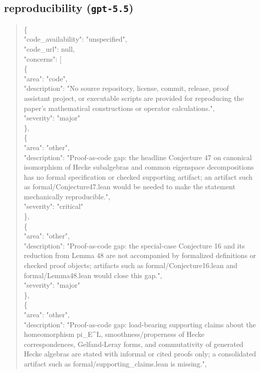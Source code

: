 \documentclass[11pt]{article}
\begin{document}
\subsection*{reproducibility (\texttt{gpt-5.5})}
\begin{quote}\small\ttfamily\raggedright
\{\\
  "code\_availability": "unspecified",\\
  "code\_url": null,\\
  "concerns": [\\
    \{\\
      "area": "code",\\
      "description": "No source repository, license, commit, release, proof assistant project, or executable scripts are provided for reproducing the paper's mathematical constructions or operator calculations.",\\
      "severity": "major"\\
    \},\\
    \{\\
      "area": "other",\\
      "description": "Proof-as-code gap: the headline Conjecture 47 on canonical isomorphism of Hecke subalgebras and common eigenspace decompositions has no formal specification or checked supporting artifact; an artifact such as formal/Conjecture47.lean would be needed to make the statement mechanically reproducible.",\\
      "severity": "critical"\\
    \},\\
    \{\\
      "area": "other",\\
      "description": "Proof-as-code gap: the special-case Conjecture 16 and its reduction from Lemma 48 are not accompanied by formalized definitions or checked proof objects; artifacts such as formal/Conjecture16.lean and formal/Lemma48.lean would close this gap.",\\
      "severity": "major"\\
    \},\\
    \{\\
      "area": "other",\\
      "description": "Proof-as-code gap: load-bearing supporting claims about the homeomorphism pi\_E\^{}L, smoothness/properness of Hecke correspondences, Gelfand-Leray forms, and commutativity of generated Hecke algebras are stated with informal or cited proofs only; a consolidated artifact such as formal/supporting\_claims.lean is missing.",\\

\end{quote}
\end{document}
